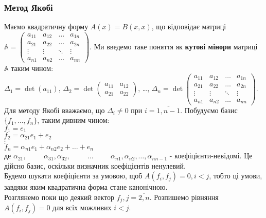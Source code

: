 \documentclass[a4paper, 10pt]{article}
\theoremstyle{theoremdd}
\begin{document}
\subsubsection*{Метод Якобі}
Маємо квадратичну форму $A(x) = B(x,x)$, що відповідає матриці $\mathbb{A} = \begin{pmatrix}
a_{11} & a_{12} & \dots & a_{1n} \\
a_{21} & a_{22} & \dots & a_{2n} \\
\vdots & \vdots & \ddots & \vdots \\
a_{n1} & a_{n2} & \dots & a_{nn} 
\end{pmatrix}$. Ми введемо таке поняття як \textbf{кутові мінори} матриці $\mathbb{A}$ таким чином:\\
$\Delta_1 = \det (a_{11})$, $\Delta_2 = \det \begin{pmatrix}
a_{11} & a_{12} \\
a_{21} & a_{22}
\end{pmatrix}$, \dots, $\Delta_n = \det \begin{pmatrix}
a_{11} & a_{12} & \dots & a_{1n} \\
a_{21} & a_{22} & \dots & a_{2n} \\
\vdots & \vdots & \ddots & \vdots \\
a_{n1} & a_{n2} & \dots & a_{nn} 
\end{pmatrix}$.\\
Для методу Якобі вважаємо, що $\Delta_i \neq 0$ при $i = \overline{1,n-1}$. Побудуємо базис $\{f_1,\dots,f_n\}$, таким дивним чином:\\
$f_1 = e_1$\\
$f_2 = \alpha_{21}e_1 + e_2$\\
$\vdots$\\
$f_n = \alpha_{n1}e_1 + \alpha_{n2}e_2 + \dots + e_n$\\
де $\alpha_{21}, \hspace{1cm} \alpha_{31}, \alpha_{32}, \hspace{1cm} \dots \hspace{1cm} \alpha_{n1}, \alpha_{n2}, \dots, \alpha_{nn-1}$ - коефіцієнти-невідомі.
Це дійсно базис, оскільки визначник коефіцієнтів ненулевий.\\
Будемо шукати коефіцієнти за умовою, щоб $A(f_i,f_j) = 0, i < j$, тобто ці умови, завдяки яким квадратична форма стане канонічною.\\
Розглянемо поки що деякий вектор $f_j, j = \overline{2,n}$. Розпишемо рівняння $A(f_i,f_j) = 0$ для всіх можливих $i < j$.\\
\end{document}
